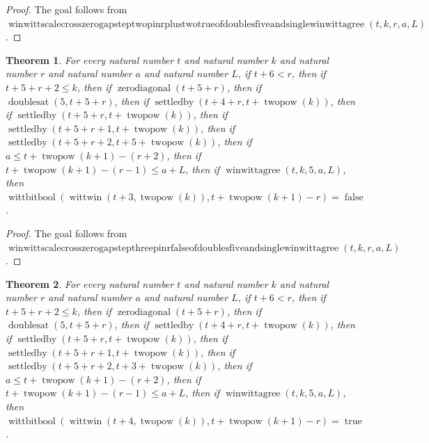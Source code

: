 \documentclass[11pt]{article}
\newtheorem{theorem}{Theorem}[section]
\theoremstyle{definition}
\begin{document}
\begin{proof}
The goal follows from \(\operatorname{winwittscalecrosszerogapsteptwopinrplustwotrueofdoublesfiveandsinglewinwittagree}(t, k, r, a, L)\).
\end{proof}
\begin{theorem}
\label{ll:paper:winwitt-scale-cross-zero-gap-step-three-pin-r-false-of-doubles-five-and-single-winwittagree}
For every natural number \(t\) and natural number \(k\) and natural number \(r\) and natural number \(a\) and natural number \(L\), if \(t + 6 < r\), then if \(t + 5 + r + 2 \le k\), then if \(\operatorname{zerodiagonal}(t + 5 + r)\), then if \(\operatorname{doublesat}(5, t + 5 + r)\), then if \(\operatorname{settledby}(t + 4 + r, t + \operatorname{twopow}(k))\), then if \(\operatorname{settledby}(t + 5 + r, t + \operatorname{twopow}(k))\), then if \(\operatorname{settledby}(t + 5 + r + 1, t + \operatorname{twopow}(k))\), then if \(\operatorname{settledby}(t + 5 + r + 2, t + 5 + \operatorname{twopow}(k))\), then if \(a \le t + \operatorname{twopow}(k + 1) - (r + 2)\), then if \(t + \operatorname{twopow}(k + 1) - (r - 1) \le a + L\), then if \(\operatorname{winwittagree}(t, k, 5, a, L)\), then \(\operatorname{wittbitbool}(\operatorname{wittwin}(t + 3, \operatorname{twopow}(k)), t + \operatorname{twopow}(k + 1) - r) = \operatorname{false}\).
\end{theorem}
\begin{proof}
The goal follows from \(\operatorname{winwittscalecrosszerogapstepthreepinrfalseofdoublesfiveandsinglewinwittagree}(t, k, r, a, L)\).
\end{proof}
\begin{theorem}
\label{ll:paper:winwitt-scale-cross-zero-gap-step-four-pin-r-true-of-doubles-five-and-single-winwittagree}
For every natural number \(t\) and natural number \(k\) and natural number \(r\) and natural number \(a\) and natural number \(L\), if \(t + 6 < r\), then if \(t + 5 + r + 2 \le k\), then if \(\operatorname{zerodiagonal}(t + 5 + r)\), then if \(\operatorname{doublesat}(5, t + 5 + r)\), then if \(\operatorname{settledby}(t + 4 + r, t + \operatorname{twopow}(k))\), then if \(\operatorname{settledby}(t + 5 + r, t + \operatorname{twopow}(k))\), then if \(\operatorname{settledby}(t + 5 + r + 1, t + \operatorname{twopow}(k))\), then if \(\operatorname{settledby}(t + 5 + r + 2, t + 3 + \operatorname{twopow}(k))\), then if \(a \le t + \operatorname{twopow}(k + 1) - (r + 2)\), then if \(t + \operatorname{twopow}(k + 1) - (r - 1) \le a + L\), then if \(\operatorname{winwittagree}(t, k, 5, a, L)\), then \(\operatorname{wittbitbool}(\operatorname{wittwin}(t + 4, \operatorname{twopow}(k)), t + \operatorname{twopow}(k + 1) - r) = \operatorname{true}\).
\end{theorem}
\end{document}
